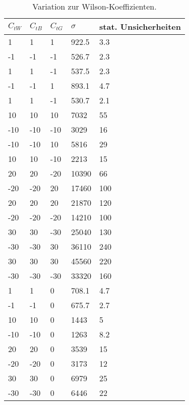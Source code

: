 \begin{table}
  \centering
  \caption{Variation zur Wilson-Koeffizienten.}
  \begin{tabular}{lllll}
    \toprule
    $C_{tW}$ & $C_{tB}$ & $C_{tG}$ & $\sigma$ & stat. Unsicherheiten\\
		\midrule
  1     &    1      &     1      &      922.5  &     3.3\\
  -1    &    -1     &     -1     &      526.7  &     2.3\\
  1     &    1      &     -1     &      537.5  &     2.3\\
  -1    &     -1    &      1     &      893.1  &     4.7\\
  1     &     1     &      -1    &      530.7  &     2.1\\
  10    &    10     &     10     &      7032   &     55\\
  -10   &    -10    &     -10    &      3029   &     16\\
  -10   &     -10   &      10    &      5816   &     29\\
  10    &    10     &     -10    &      2213   &     15\\
  20    &    20     &     -20    &      10390  &     66\\
  -20   &    -20    &     20     &      17460  &     100\\
  20    &    20     &     20     &      21870  &     120\\
  -20   &    -20    &     -20    &      14210  &     100\\
  30    &    30     &     -30    &      25040  &     130\\
  -30   &    -30    &     30     &      36110  &     240\\
  30    &    30     &     30     &      45560  &     220\\
  -30   &    -30    &     -30    &      33320  &     160\\
  1     &    1      &     0      &      708.1  &     4.7\\
  -1    &    -1     &     0      &      675.7  &     2.7\\
  10    &    10     &     0      &      1443   &     5\\
  -10   &    -10    &     0      &      1263   &     8.2\\
  20    &    20     &     0      &      3539   &     15\\
  -20   &    -20    &     0      &      3173   &     12\\
  30    &    30     &     0      &      6979   &     25\\
  -30   &    -30    &     0      &      6446   &     22\\
    \bottomrule
  \end{tabular}
  \label{tab:lit}
\end{table}
